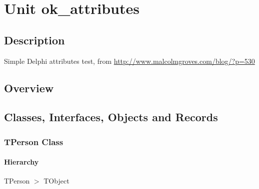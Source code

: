 \documentclass{report}
\newif\ifpdf
\begin{document}
\label{toc}\tableofcontents
\newpage
\newlength{\tmplength}
\chapter{Unit ok{\_}attributes}
\label{ok_attributes}
\section{Description}
Simple Delphi attributes test, from \href{http://www.malcolmgroves.com/blog/?p=530}{http://www.malcolmgroves.com/blog/?p=530}
\section{Overview}
\begin{description}
\item[\texttt{\begin{ttfamily}TPerson\end{ttfamily} Class}]
\item[\texttt{\begin{ttfamily}IUIContainer\end{ttfamily} Interface}]
\end{description}
\section{Classes, Interfaces, Objects and Records}
\ifpdf
\subsection*{\large{\textbf{TPerson Class}}\normalsize\hspace{1ex}\hrulefill}
\else
\subsection*{TPerson Class}
\fi
\label{ok_attributes.TPerson}
\subsubsection*{\large{\textbf{Hierarchy}}\normalsize\hspace{1ex}\hfill}
TPerson {$>$} TObject
\end{document}
